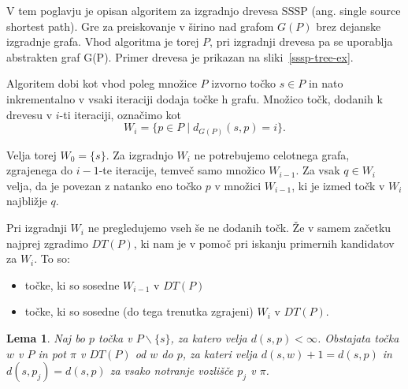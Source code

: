 \documentclass[a4paper, 12pt]{book}
\newtheorem{lema}[izrek]{Lema}
\begin{document}
V tem poglavju je opisan algoritem za izgradnjo drevesa SSSP (ang. single source shortest path). Gre za preiskovanje v širino nad grafom $G(P)$ brez dejanske izgradnje grafa. Vhod algoritma je torej $P$, pri izgradnji drevesa pa se uporablja abstrakten graf G(P). Primer drevesa je prikazan na sliki~\ref{sssp-tree-ex}.



Algoritem dobi kot vhod poleg množice $P$ izvorno točko $s\in P$ in nato inkrementalno v vsaki iteraciji dodaja točke h grafu. Množico točk, dodanih k drevesu v $i$-ti iteraciji, označimo kot
\[	W_i = \{ p\in P \mid d_{G(P)}(s,p) = i\}.
	\]

Velja torej $W_0 = \{s\}$. Za izgradnjo $W_i$ ne potrebujemo celotnega grafa, zgrajenega do $i-1$-te iteracije, temveč samo množico $W_{i-1}$.  Za vsak $q\in W_i$ velja, da je povezan z natanko eno točko $p$ v množici $W_{i-1}$,  ki je izmed točk v $W_i$ najbližje $q$.

Pri izgradnji $W_i$ ne pregledujemo vseh še ne dodanih točk. Že v samem začetku najprej zgradimo $DT(P)$, ki nam je v pomoč pri iskanju primernih kandidatov za $W_i$. To so:

\begin{itemize}
\item točke, ki so sosedne $W_{i-1}$ v $DT(P)$
\item točke, ki so sosedne (do tega trenutka zgrajeni) $W_i$ v $DT(P)$.
\end{itemize} 

\begin{lema}
\label{lema1}
Naj bo $p$ točka v $P\backslash \{s\}$, za katero velja $d(s,p) < \infty$. Obstajata točka $w$ v $P$ in pot $\pi$ v $DT(P)$ od $w$ do $p$, za kateri velja $d(s,w)+1 = d(s,p)$ in $d(s,p_j) = d(s,p)$ za vsako notranje vozlišče $p_j$ v $\pi$.
\end{lema}
\end{document}
